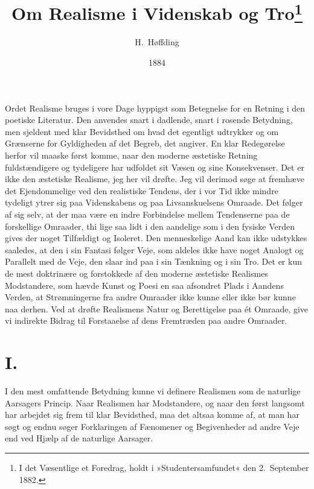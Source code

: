 \documentclass[12pt,a4paper]{article}
\title{\textbf{Om Realisme i Videnskab og Tro}\footnote{I det
Væsentlige et Foredrag, holdt i »Studentersamfundet« den 2.\ September
1882.}}
\author{H.\ Høffding}
\date{1884}
\begin{document}
\maketitle
\thispagestyle{fancy}

\bigskip

\noindent Ordet Realisme bruges i vore Dage hyppigst som Betegnelse for
en Retning i den poetiske Literatur. Den anvendes snart i dadlende,
snart i rosende Betydning, men sjeldent med klar Bevidsthed om hvad det
egentligt udtrykker og om Grænserne for Gyldigheden af det Begreb, det
angiver. En klar Redegørelse herfor vil maaske først komme, naar den
moderne æstetiske Retning fuldstændigere og tydeligere har udfoldet sit
Væsen og sine Konsekvenser. Det er ikke den æstetiske Realisme, jeg her
vil drøfte. Jeg vil derimod søge at fremhæve det Ejendommelige ved den
realistiske Tendens, der i vor Tid ikke mindre tydeligt ytrer sig paa
Videnskabens og paa Livsanskuelsens Omraade. Det følger af sig selv, at
der maa være en indre Forbindelse mellem Tendenserne paa de forskellige
Omraader, thi lige saa lidt i den aandelige som i den fysiske Verden
gives der noget Tilfældigt og Isoleret. Den menneskelige Aand kan ikke
udstykkes saaledes, at den i sin Fantasi følger Veje, som aldeles ikke
have noget Analogt og Parallelt med de Veje, den slaar ind paa i sin
Tænkning og i sin Tro. Det er kun de mest doktrinære og forstokkede af
den moderne æstetiske Realismes Modstandere, som hævde Kunst og Poesi
en saa afsondret Plads i Aandens Verden, at Strømningerne fra andre
Omraader ikke kunne eller ikke bør kunne naa derhen. Ved at drøfte
Realismens Natur og Berettigelse paa ét Omraade, give vi indirekte
Bidrag til Forstaaelse af dens Fremtræden paa andre Omraader.

\section*{I.}

I den mest omfattende Betydning kunne vi definere Realismen som de
naturlige Aarsagers Princip. Naar Realismen har Modstandere, og naar
den først langsomt har arbejdet sig frem til klar Bevidsthed, maa det
altsaa komme af, at man har søgt og endnu søger Forklaringen af
Fænomener og Begivenheder ad andre Veje end ved Hjælp af de naturlige
Aarsager.
\end{document}
